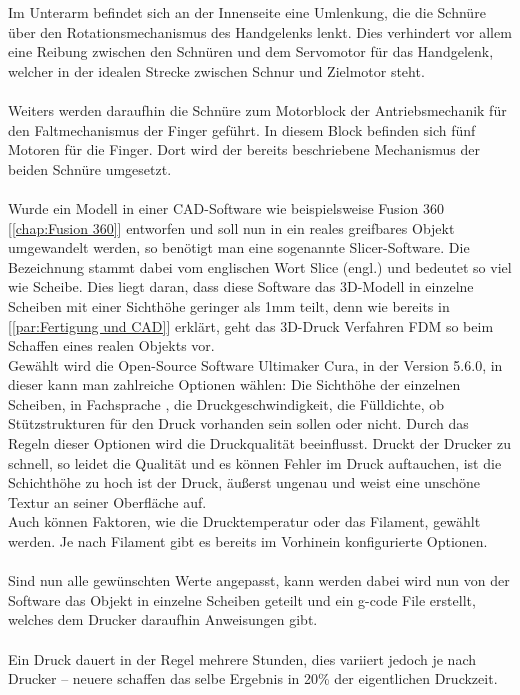 \documentclass[titlepage,12pt,twoside]{article}
\begin{document}
\hfill \break
Im Unterarm befindet sich an der Innenseite eine Umlenkung, die die Schnüre über den Rotationsmechanismus des Handgelenks lenkt. Dies verhindert vor allem eine Reibung zwischen den Schnüren und dem Servomotor für das Handgelenk, welcher in der 
idealen Strecke zwischen Schnur und Zielmotor steht. \\
\\
Weiters werden daraufhin die Schnüre zum Motorblock der Antriebsmechanik für den Faltmechanismus der Finger geführt. In diesem Block befinden sich fünf Motoren für die Finger.
Dort wird der bereits beschriebene Mechanismus der beiden Schnüre umgesetzt. \\
\\
Wurde ein Modell in einer CAD-Software wie beispielsweise Fusion 360 [\textcolor{blue}{\autoref{chap:Fusion 360}}] entworfen und soll nun in ein reales greifbares Objekt umgewandelt werden, so benötigt man eine sogenannte Slicer-Software. Die Bezeichnung  stammt dabei vom englischen 
Wort Slice (engl.) und bedeutet so viel wie Scheibe. Dies liegt daran, dass diese Software das 3D-Modell in einzelne Scheiben mit einer Sichthöhe geringer als 1mm teilt, denn wie bereits in [\textcolor{blue}{\autoref{par:Fertigung und CAD}}] erklärt, geht das 3D-Druck Verfahren 
FDM so beim Schaffen eines realen Objekts vor. \\
Gewählt wird die Open-Source Software Ultimaker Cura, in der Version 5.6.0, in dieser kann man zahlreiche Optionen wählen: Die Sichthöhe der einzelnen Scheiben, in Fachsprache , die Druckgeschwindigkeit, die Fülldichte, ob Stützstrukturen für den 
Druck vorhanden sein sollen oder nicht. Durch das Regeln dieser Optionen wird die Druckqualität beeinflusst. Druckt der Drucker zu schnell, so leidet die Qualität und es können Fehler im Druck auftauchen, ist die Schichthöhe zu hoch ist der Druck, 
äußerst ungenau und weist eine unschöne Textur an seiner Oberfläche auf. \\
Auch können Faktoren, wie die Drucktemperatur oder das Filament, gewählt werden. Je nach Filament gibt es bereits im Vorhinein konfigurierte Optionen. \\
\\
Sind nun alle gewünschten Werte angepasst, kann  werden dabei wird nun von der Software das Objekt in einzelne Scheiben geteilt und ein g-code File erstellt, welches dem Drucker daraufhin Anweisungen gibt. \\
\\
Ein Druck dauert in der Regel mehrere Stunden, dies variiert jedoch je nach Drucker – neuere schaffen das selbe Ergebnis in 20\% der eigentlichen Druckzeit. \\
\end{document}
